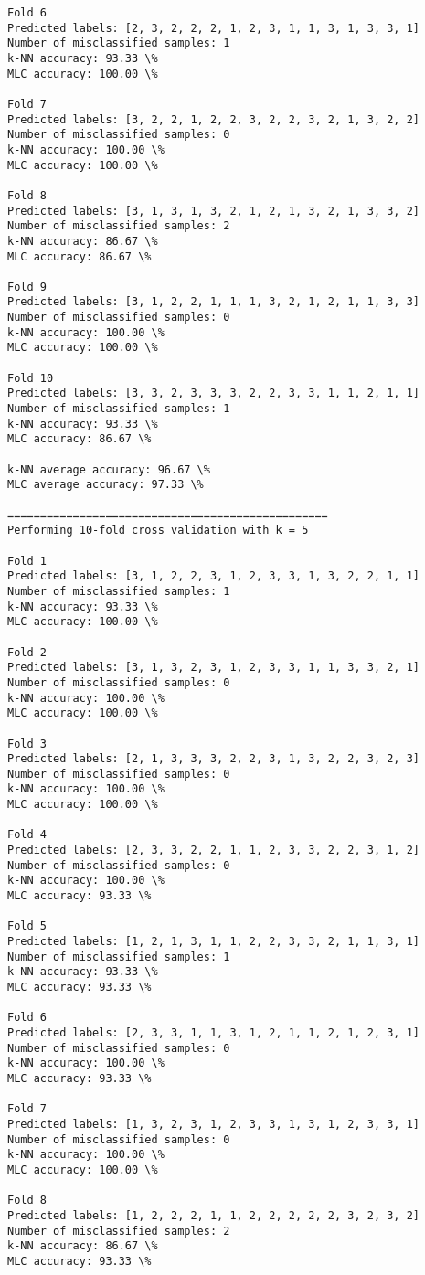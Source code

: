 \documentclass[11pt]{article}
\begin{document}
\begin{Verbatim}[commandchars=\\\{\}]
Fold 6
Predicted labels: [2, 3, 2, 2, 2, 1, 2, 3, 1, 1, 3, 1, 3, 3, 1]
Number of misclassified samples: 1
k-NN accuracy: 93.33 \%
MLC accuracy: 100.00 \%

Fold 7
Predicted labels: [3, 2, 2, 1, 2, 2, 3, 2, 2, 3, 2, 1, 3, 2, 2]
Number of misclassified samples: 0
k-NN accuracy: 100.00 \%
MLC accuracy: 100.00 \%

Fold 8
Predicted labels: [3, 1, 3, 1, 3, 2, 1, 2, 1, 3, 2, 1, 3, 3, 2]
Number of misclassified samples: 2
k-NN accuracy: 86.67 \%
MLC accuracy: 86.67 \%

Fold 9
Predicted labels: [3, 1, 2, 2, 1, 1, 1, 3, 2, 1, 2, 1, 1, 3, 3]
Number of misclassified samples: 0
k-NN accuracy: 100.00 \%
MLC accuracy: 100.00 \%

Fold 10
Predicted labels: [3, 3, 2, 3, 3, 3, 2, 2, 3, 3, 1, 1, 2, 1, 1]
Number of misclassified samples: 1
k-NN accuracy: 93.33 \%
MLC accuracy: 86.67 \%

k-NN average accuracy: 96.67 \%
MLC average accuracy: 97.33 \%

=================================================
Performing 10-fold cross validation with k = 5

Fold 1
Predicted labels: [3, 1, 2, 2, 3, 1, 2, 3, 3, 1, 3, 2, 2, 1, 1]
Number of misclassified samples: 1
k-NN accuracy: 93.33 \%
MLC accuracy: 100.00 \%

Fold 2
Predicted labels: [3, 1, 3, 2, 3, 1, 2, 3, 3, 1, 1, 3, 3, 2, 1]
Number of misclassified samples: 0
k-NN accuracy: 100.00 \%
MLC accuracy: 100.00 \%

Fold 3
Predicted labels: [2, 1, 3, 3, 3, 2, 2, 3, 1, 3, 2, 2, 3, 2, 3]
Number of misclassified samples: 0
k-NN accuracy: 100.00 \%
MLC accuracy: 100.00 \%

Fold 4
Predicted labels: [2, 3, 3, 2, 2, 1, 1, 2, 3, 3, 2, 2, 3, 1, 2]
Number of misclassified samples: 0
k-NN accuracy: 100.00 \%
MLC accuracy: 93.33 \%

Fold 5
Predicted labels: [1, 2, 1, 3, 1, 1, 2, 2, 3, 3, 2, 1, 1, 3, 1]
Number of misclassified samples: 1
k-NN accuracy: 93.33 \%
MLC accuracy: 93.33 \%

Fold 6
Predicted labels: [2, 3, 3, 1, 1, 3, 1, 2, 1, 1, 2, 1, 2, 3, 1]
Number of misclassified samples: 0
k-NN accuracy: 100.00 \%
MLC accuracy: 93.33 \%

Fold 7
Predicted labels: [1, 3, 2, 3, 1, 2, 3, 3, 1, 3, 1, 2, 3, 3, 1]
Number of misclassified samples: 0
k-NN accuracy: 100.00 \%
MLC accuracy: 100.00 \%

Fold 8
Predicted labels: [1, 2, 2, 2, 1, 1, 2, 2, 2, 2, 2, 3, 2, 3, 2]
Number of misclassified samples: 2
k-NN accuracy: 86.67 \%
MLC accuracy: 93.33 \%


\end{Verbatim}
\end{document}

